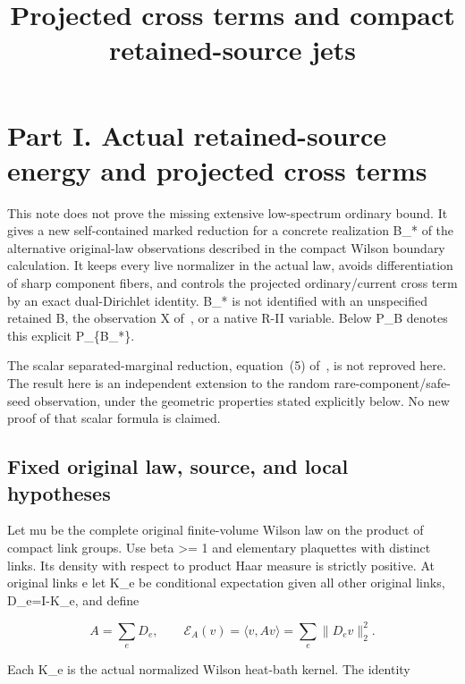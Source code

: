 \documentclass[
  11pt,
]{article}
\title{Projected cross terms and compact retained-source jets}\author{}\date{}
\begin{document}
\maketitle
\hypertarget{part-i.-actual-retained-source-energy-and-projected-cross-terms}{%
\section{Part I. Actual retained-source energy and projected cross
terms}\label{part-i.-actual-retained-source-energy-and-projected-cross-terms}}

This note does not prove the missing extensive
low-spectrum ordinary bound. It gives a new self-contained marked
reduction for a concrete realization B\_* of the alternative
original-law observations described in the compact Wilson boundary calculation.
It keeps every live normalizer in the actual law, avoids differentiation
of sharp component fibers, and controls the projected ordinary/current
cross term by an exact dual-Dirichlet identity. B\_* is not identified
with an unspecified retained B, the observation X of~\cite{CT}, or a native R-II variable.
Below P\_B denotes this explicit P\_\{B\_*\}.

The scalar separated-marginal reduction, equation~(5) of~\cite[\S1]{OS}, is not
reproved here. The result here is an
independent extension to the random rare-component/safe-seed
observation, under the geometric properties stated explicitly below. No
new proof of that scalar formula is claimed.

\hypertarget{fixed-original-law-source-and-local-hypotheses}{%
\subsection{Fixed original law, source, and local
hypotheses}\label{fixed-original-law-source-and-local-hypotheses}}

Let mu be the complete original finite-volume Wilson law on the product
of compact link groups. Use beta \textgreater= 1 and elementary
plaquettes with distinct links. Its density with respect to product Haar
measure is strictly positive. At original links e let K\_e be
conditional expectation given all other original links, D\_e=I-K\_e, and
define

\[
 A=\sum_e D_e,\qquad
 \mathcal E_A(v)=\langle v,Av\rangle
                 =\sum_e\|D_ev\|_2^2.
 \tag{1.1}
\]

Each K\_e is the actual normalized Wilson heat-bath kernel. The identity
\end{document}
